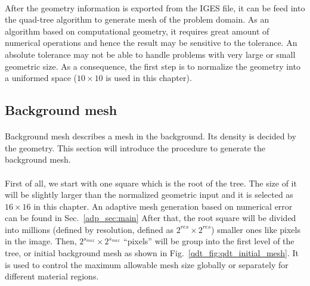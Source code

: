 \paragraph{}
After the geometry information is exported from the IGES file, it can be feed into the quad-tree algorithm to generate mesh of the problem domain.
As an algorithm based on computational geometry, it requires great amount of numerical operations and hence the result may be sensitive to the tolerance.
An absolute tolerance may not be able to handle problems with very large or small geometric size.
As a consequence, the first step is to normalize the geometry into a uniformed space ($10\times10$ is used in this chapter).

\subsection{Background mesh}
\label{qdt_sc:qdt_background_mesh}
\paragraph{}
Background mesh describes a mesh in the background. %
Its density is decided by the geometry.
This section will introduce the procedure to generate the background mesh.
\paragraph{}
First of all, we start with one square which is the root of the tree.
The size of it will be slightly larger than the normalized geometric input and it is selected as $16 \times 16$ in this chapter.
An adaptive mesh generation based on numerical error can be found in Sec.~\ref{adp_sec:main}
After that, the root square will be divided into millions (defined by resolution, defined as $2^{res} \times 2^{res}$) smaller ones like pixels in the image.
Then, $2^{s_{max}} \times 2^{s_{max}}$ ``pixels'' will be group into the first level of the tree, or initial background mesh as shown in Fig.~\ref{qdt_fig:qdt_initial_mesh}.
It is used to control the maximum allowable mesh size globally or separately for different material regions.

